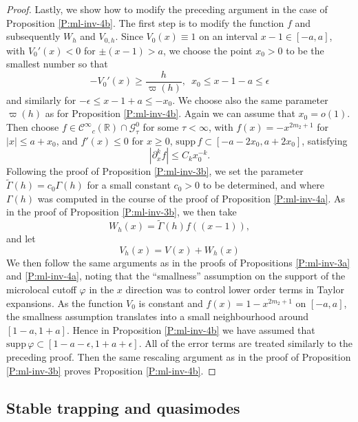 \documentclass[twoside, final]{amsart}
\theoremstyle{definition}
\numberwithin{equation}{section}
\begin{document}
\begin{proof}
Lastly, we show how to modify the preceding argument in the case of
Proposition \ref{P:ml-inv-4b}.  The first step is to modify the function $f$
and subsequently $W_h$ and $V_{0,h}$.  Since $V_0(x) \equiv 1$ on an
interval $x-1 \in [-a,a]$, with $V_0'(x) <0$ for $\pm (x-1) > a$, we
choose the point $x_0>0$ to be the smallest number so that
\[
-  V_0'( x ) {\geqslant} \frac{ h}{\varpi(h)}, \,\, \, x_0 {\leqslant} x-1 -a {\leqslant} \epsilon
\]
and similarly for $-\epsilon {\leqslant} x - 1 + a {\leqslant} -x_0$.  We choose
also the same parameter $\varpi(h)$ as for Proposition
\ref{P:ml-inv-4b}.  
Again we can assume that $x_0  = o(1)$.  Then choose $f \in {{\mathcal C}^\infty}_c({{\mathbb R}}) \cap {\mathcal{G}}^0_\tau$ for some $\tau
< \infty$, with $f(x) =  - 
x^{2m_2 +1}$ for $| x | {\leqslant} a + x_0$, and $f' (x) {\leqslant} 0$ for $x {\geqslant} 0$, ${\mathrm{supp}\,}
f \subset [-a-2x_0, a + 2x_0]$, satisfying
\[
| \partial_x^k f | {\leqslant} C_k x_0^{-k}.
\]
Following the proof of Proposition \ref{P:ml-inv-3b}, we set 
the parameter ${\widetilde{\Gamma}}(h) = c_0 \Gamma(h)$ for a small
constant $c_0>0$ to be determined, and where $\Gamma(h)$ was computed
in the course of the proof of Proposition \ref{P:ml-inv-4a}.  As in the
proof of Proposition \ref{P:ml-inv-3b}, we then take 
\[
W_h(x) = {\widetilde{\Gamma}}(h) f((x-1)),
\]
and let
\[
V_h(x) = V(x) + W_h(x)
\]
We then follow the same arguments as in the proofs of Propositions
\ref{P:ml-inv-3a} and \ref{P:ml-inv-4a}, noting that the ``smallness''
assumption on the support of the microlocal cutoff ${\varphi}$ in the $x$
direction was to control lower order terms in Taylor expansions.  As
the function $V_0$ is constant and $f(x) = 1-x^{2m_2+1}$ on $[-a,a]$, the smallness assumption
translates into a small neighbourhood around $[1-a,1+a]$.  Hence in
Proposition 
\ref{P:ml-inv-4b} we have assumed that ${\mathrm{supp}\,} {\varphi} \subset
[1-a-\epsilon, 1+a + \epsilon]$.  All of the error terms are treated
similarly to the preceding proof.  Then the same rescaling argument as
in the proof of Proposition \ref{P:ml-inv-3b} proves Proposition \ref{P:ml-inv-4b}.

\end{proof}

\subsection{Stable trapping and quasimodes}

\label{SS:stable}
\end{document}
